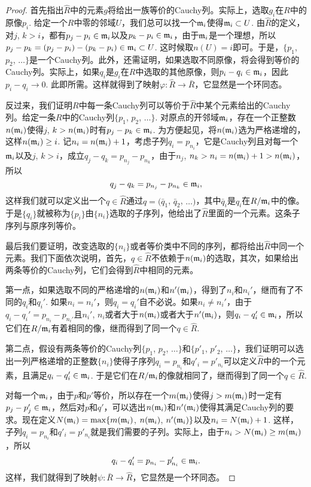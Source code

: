 \begin{proof}
	首先指出$\hat R$中的元素$g$将给出一族等价的Cauchy列。实际上，选取$g_i$在$R$中的原像$p_i$. 给定一个$R$中零的邻域$U$，我们总可以找一个$\mathfrak{m}_i$使得$\mathfrak{m}_i\subset U$. 由$\hat R$的定义，对$j$, $k>i$，都有$p_j-p_i\in \mathfrak{m}_i$以及$p_k-p_i \in \mathfrak{m}_i$，由于$\mathfrak{m}_i$是一个理想，所以$p_j-p_k=(p_j-p_i)-(p_k-p_i)\in \mathfrak{m}_i\subset U$. 这时候取$n(U)=i$即可。于是，$\{p_1$, $p_2$, $\dots\}$是一个Cauchy列。此外，还需证明，如果选取不同原像，将会得到等价的Cauchy列。实际上，如果$q_i$是$g_i$在$R$中选取的其他原像，则$p_i-q_i\in \mathfrak{m}_i$，因此$p_i-q_i\to 0$. 此即所需。这样就得到了映射$\varphi:\hat{R}\to \bar{R}$，它显然是一个环同态。

	反过来，我们证明$R$中每一条Cauchy列可以等价于$\hat R$中某个元素给出的Cauchy列。给定一条$R$中的Cauchy列$\{p_1$, $p_2$, $\dots\}$. 对原点的开邻域$\mathfrak{m}_i$，存在一个正整数$n(\mathfrak{m}_i)$使得$j$, $k>n(\mathfrak{m}_i)$时有$p_j-p_k\in \mathfrak{m}_i$. 为方便起见，将$n(\mathfrak{m}_i)$选为严格递增的，这样$n(\mathfrak{m}_i)\geq i$. 记$n_i=n(\mathfrak{m}_i)+1$，考虑子列$q_i=p_{n_i}$，它是Cauchy列且对每一个$\mathfrak{m}_i$以及$j$, $k>i$，成立$q_j-q_k=p_{n_j}-p_{n_k}$，由于$n_j$, $n_k>n_i=n(\mathfrak{m}_i)+1>n(\mathfrak{m}_i)$，所以
	\[
		q_j-q_k=p_{n_j}-p_{n_k}\in \mathfrak{m}_i,
	\]
	这样我们就可以定义出一个$q\in \hat R$通过$q=(\bar{q}_1$, $\bar{q}_2$, $\dots)$，其中$\bar{q}_i$是$q_i$在$R/\mathfrak{m}_i$中的像。于是$\{q_i\}$就被称为$\{p_i\}$由$\{n_i\}$选取的子序列，他给出了$\hat R$里面的一个元素。这条子序列与原序列等价。

	最后我们要证明，改变选取的$\{n_i\}$或者等价类中不同的序列，都将给出$\hat R$中同一个元素。我们下面依次说明，首先，$q\in \hat R$不依赖于$n(\mathfrak{m}_i)$的选取，其次，如果给出两条等价的Cauchy列，它们会得到$\hat R$中相同的元素。

	第一点，如果选取不同的严格递增的$n(\mathfrak{m}_i)$和$n'(\mathfrak{m}_i)$，得到了$n_i$和$n_i'$，继而有了不同的$q_i$和$q_i'$. 如果$n_i=n_i'$，则$q_i=q_i'$自不必说。如果$n_i\neq n_i'$，由于$q_i-q_i'=p_{n_i}-p_{n_i'}$且$n_i'$, $n_i$或者大于$n(\mathfrak{m}_i)$或者大于$n'(\mathfrak{m}_i)$，则$q_i-q_i'\in \mathfrak{m}_i$，所以它们在$R/\mathfrak{m}_i$有着相同的像，继而得到了同一个$q\in\hat R$.

	第二点，假设有两条等价的Cauchy列$\{p_1$, $p_2$, $\dots\}$和$\{p'_1$, $p'_2$, $\dots\}$，我们证明可以选出一列严格递增的正整数$\{n_i\}$使得子序列$q_i=p_{n_i}$和$q'_i=p'_{n_i}$可以定义$\hat R$中的一个元素，且满足$q_i-q_i'\in \mathfrak{m}_i$. 于是它们在$R/\mathfrak{m}_i$的像就相同了，继而得到了同一个$q\in\hat R$.

	对每一个$\mathfrak{m}_i$，由于$p$和$p'$等价，所以存在一个$m(\mathfrak{m}_i)$使得$j>m(\mathfrak{m}_i)$时一定有$p_j-p'_j\in \mathfrak{m}_i$，然后对$p$和$q'$，可以选出$n(\mathfrak{m}_i)$和$n'(\mathfrak{m}_i)$使得其满足Cauchy列的要求。现在定义$N(\mathfrak{m}_i)=\max\{m(\mathfrak{m}_i)$, $n(\mathfrak{m}_i)$, $n'(\mathfrak{m}_i)\}$以及$n_i=N(\mathfrak{m}_i)+1$. 这样，子列$q_i=p_{n_i}$和$q'_i=p'_{n_i}$就是我们需要的子列。实际上，由于$n_i>N(\mathfrak{m}_i)\geq m(\mathfrak{m}_i)$，所以
	\[
		q_i-q'_i=p_{n_i}-p'_{n_i}\in \mathfrak{m}_i.
	\]
	这样，我们就得到了映射$\psi:\bar{R}\to \hat{R}$，它显然是一个环同态。


\end{proof}
